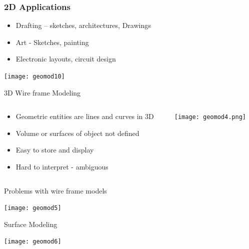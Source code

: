 \begin{frame}[fragile]\frametitle{2D Applications}
\begin{itemize}
\item Drafting – sketches, architectures, Drawings
\item Art - Sketches, painting
\item Electronic layouts, circuit design
\end{itemize}

			\begin{center}
	\texttt{[image: geomod10]}
			\end{center}
\end{frame}


\begin{frame}[fragile]{3D Wire frame Modeling}
 \begin{columns}
  \begin{column}{0.55\linewidth}
\begin{itemize}
\item Geometric entities are lines and curves in 3D
\item Volume or surfaces of object not defined
\item Easy to store and display
\item Hard to interpret - ambiguous
\end{itemize}
  \end{column}%
  \begin{column}{0.45\linewidth}
			\begin{center}
	\texttt{[image: geomod4.png]}

			\end{center}
  \end{column}
 \end{columns}
 
\end{frame}

\begin{frame}[fragile]{Problems with wire frame models}
			\begin{center}
	\texttt{[image: geomod5]}
			\end{center}
\end{frame}

\begin{frame}[fragile]{Surface Modeling}
			\begin{center}
	\texttt{[image: geomod6]}
			\end{center}
\end{frame}

